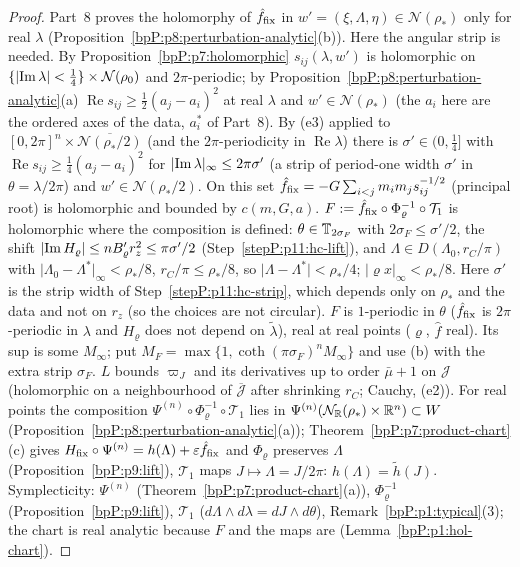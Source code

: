 \begin{proof}
\label{stepP:p11:hc-strip} Part~8 proves the holomorphy of $\hat f_{\rm fix}$ in $w'=(\xi,\Lambda,\eta)\in\mathcal N(\rho_*)$ only for real $\lambda$ (Proposition~\ref{bpP:p8:perturbation-analytic}(b)). Here the angular strip is needed. By Proposition~\ref{bpP:p7:holomorphic} $s_{ij}(\lambda,w')$ is holomorphic on $\{\lvert \operatorname{Im}\lambda\rvert<\frac14\}\times\mathcal N(\rho_0)$ and $2\pi$-periodic; by Proposition~\ref{bpP:p8:perturbation-analytic}(a) $\operatorname{Re}s_{ij}\ge\frac12(a_j-a_i)^2$ at real $\lambda$ and $w'\in\mathcal N(\rho_*)$ (the $a_i$ here are the ordered axes of the data, $a_i^*$ of Part~8). By (e3) applied to $[0,2\pi]^n\times\overline{\mathcal N(\rho_*/2)}$ (and the $2\pi$-periodicity in $\operatorname{Re}\lambda$) there is $\sigma'\in(0,\frac14]$ with $\operatorname{Re}s_{ij}\ge\frac14(a_j-a_i)^2$ for $\lvert \operatorname{Im}\lambda\rvert_\infty\le2\pi\sigma'$ (a strip of period-one width $\sigma'$ in $\theta=\lambda/2\pi$) and $w'\in\mathcal N(\rho_*/2)$. On this set $\hat f_{\rm fix}=-G\sum_{i<j}m_im_js_{ij}^{-1/2}$ (principal root) is holomorphic and bounded by $c(m,G,a)$.
\label{stepP:p11:hc-F} $F:=\hat f_{\rm fix}\circ\Phi_\varrho^{-1}\circ\mathcal T_1$ is holomorphic where the composition is defined: $\theta\in\mathbb{T}_{2\sigma_F}$ with $2\sigma_F\le\sigma'/2$, the shift $\lvert \operatorname{Im}H_\varrho\rvert\le nB'_\varrho r_z^2\le\pi\sigma'/2$ (Step~\ref{stepP:p11:hc-lift}), and $\Lambda\in D(\Lambda_0,r_C/\pi)$ with $\lvert\Lambda_0-\Lambda^*\rvert_\infty<\rho_*/8$, $r_C/\pi\le\rho_*/8$, so $\lvert\Lambda-\Lambda^*\rvert<\rho_*/4$; $\lvert\varrho x\rvert_\infty<\rho_*/8$. Here $\sigma'$ is the strip width of Step~\ref{stepP:p11:hc-strip}, which depends only on $\rho_*$ and the data and not on $r_z$ (so the choices are not circular). $F$ is $1$-periodic in $\theta$ ($\hat f_{\rm fix}$ is $2\pi$-periodic in $\lambda$ and $H_\varrho$ does not depend on $\tilde\lambda$), real at real points ($\varrho$, $\hat f$ real). Its sup is some $M_\infty$; put $M_F=\max\{1,\coth(\pi\sigma_F)^nM_\infty\}$ and use (b) with the extra strip $\sigma_F$. $L$ bounds $\varpi_J$ and its derivatives up to order $\bar\mu+1$ on $\mathcal J$ (holomorphic on a neighbourhood of $\overline{\mathcal J}$ after shrinking $r_C$; Cauchy, (e2)).
\label{stepP:p11:hc-id} For real points the composition $\Psi^{(n)}\circ\Phi_\varrho^{-1}\circ\mathcal T_1$ lies in $\Psi^{(n)}(\mathcal N_{\mathbb{R}}(\rho_*)\times\mathbb{R}^n)\subset W$ (Proposition~\ref{bpP:p8:perturbation-analytic}(a)); Theorem~\ref{bpP:p7:product-chart}(c) gives $H_{\rm fix}\circ\Psi^{(n)}=h(\Lambda)+\varepsilon\hat f_{\rm fix}$ and $\Phi_\varrho$ preserves $\Lambda$ (Proposition~\ref{bpP:p9:lift}), $\mathcal T_1$ maps $J\mapsto\Lambda=J/2\pi$: $h(\Lambda)=\tilde h(J)$. Symplecticity: $\Psi^{(n)}$ (Theorem~\ref{bpP:p7:product-chart}(a)), $\Phi_\varrho^{-1}$ (Proposition~\ref{bpP:p9:lift}), $\mathcal T_1$ ($d\Lambda\wedge d\lambda=dJ\wedge d\theta$), Remark~\ref{bpP:p1:typical}(3); the chart is real analytic because $F$ and the maps are (Lemma~\ref{bpP:p1:hol-chart}).

\end{proof}
